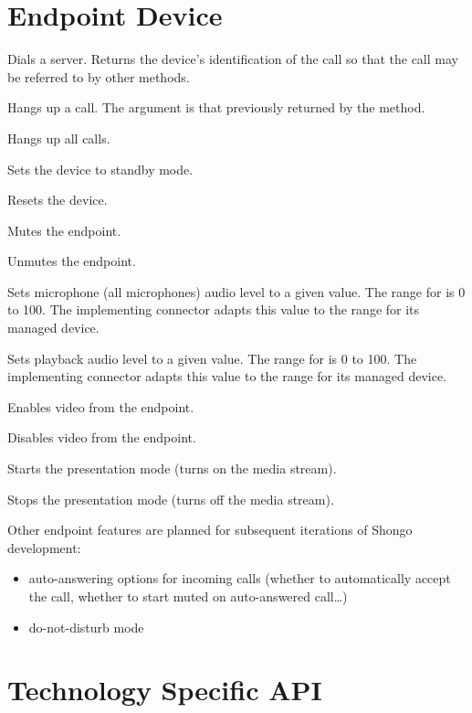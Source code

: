 \section{Endpoint Device} \label{sect:connector-endpoint-api}

\begin{Api}

Dials a server. Returns the device's identification of the call so that the call may be referred to by other methods.

Hangs up a call. The  argument is that previously returned by the  method.

Hangs up all calls.

Sets the device to standby mode.

Resets the device.

Mutes the endpoint.

Unmutes the endpoint.

Sets microphone (all microphones) audio level to a given value. The range for  is 0 to 100. The implementing connector adapts this value to the range for its managed device.

Sets playback audio level to a given value. The range for  is 0 to 100. The implementing connector adapts this value to the range for its managed device.

Enables video from the endpoint.

Disables video from the endpoint.

Starts the presentation mode (turns on the media stream).

Stops the presentation mode (turns off the media stream).

\end{Api}

Other endpoint features are planned for subsequent iterations of Shongo development:
\begin{itemize}
\item auto-answering options for incoming calls (whether to automatically accept the call, whether to start muted on auto-answered call\ldots)
\item do-not-disturb mode
\end{itemize}


\section{Technology Specific API}



